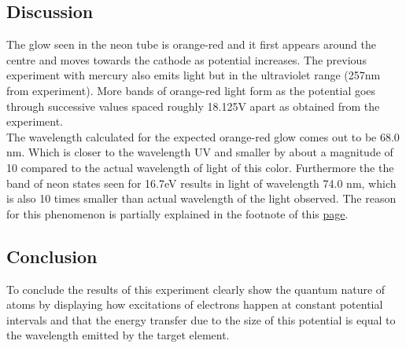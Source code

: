 \documentclass[11pt]{article}
\begin{document}
\subsection{Discussion}
The glow seen in the neon tube is orange-red and it first appears around the centre and moves towards the cathode as potential increases. The previous experiment with mercury also emits light but in the ultraviolet range (257nm from experiment). More bands of orange-red light form as the potential goes through successive values spaced roughly 18.125V apart as obtained from the experiment.\\
The wavelength calculated for the expected orange-red glow comes out to be 68.0 nm. Which is closer to the wavelength UV and smaller by about a magnitude of 10 compared to the actual wavelength of light of this color. Furthermore the the band of neon states seen for 16.7eV results in light of wavelength 74.0 nm, which is also 10 times smaller than actual wavelength of the light observed. The reason for this phenomenon is partially explained in the footnote of this \href{https://books.google.ca/books?id=xQfKWwvH42kC&pg=PA32&redir_esc=y#v=onepage&q&f=false}{page}.
\subsection{Conclusion}
To conclude the results of this experiment clearly show the quantum nature of atoms by displaying how excitations of electrons happen at constant potential intervals and that the energy transfer due to the size of this potential is equal to the wavelength emitted by the target element. 
\end{document}
